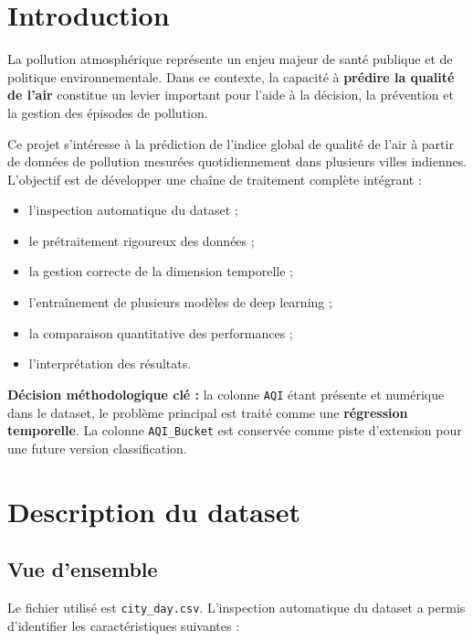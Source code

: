 \documentclass[11pt,a4paper]{article}
\newcommand{\aqi}{\texttt{AQI}}
\newcommand{\aqibucket}{\texttt{AQI\_Bucket}}
\begin{document}
\tableofcontents
\newpage

\section{Introduction}
La pollution atmosphérique représente un enjeu majeur de santé publique et de politique environnementale.
Dans ce contexte, la capacité à \textbf{prédire la qualité de l'air} constitue un levier important pour l'aide à la décision,
la prévention et la gestion des épisodes de pollution.

Ce projet s'intéresse à la prédiction de l'indice global de qualité de l'air à partir de données de pollution mesurées
quotidiennement dans plusieurs villes indiennes. L'objectif est de développer une chaîne de traitement complète intégrant :

\begin{itemize}
    \item l'inspection automatique du dataset ;
    \item le prétraitement rigoureux des données ;
    \item la gestion correcte de la dimension temporelle ;
    \item l'entraînement de plusieurs modèles de deep learning ;
    \item la comparaison quantitative des performances ;
    \item l'interprétation des résultats.
\end{itemize}

\begin{highlightbox}
\textbf{Décision méthodologique clé :} la colonne \aqi{} étant présente et numérique dans le dataset,
le problème principal est traité comme une \textbf{régression temporelle}. La colonne \aqibucket{} est conservée
comme piste d'extension pour une future version classification.
\end{highlightbox}

\section{Description du dataset}

\subsection{Vue d'ensemble}
Le fichier utilisé est \texttt{city\_day.csv}. L'inspection automatique du dataset a permis d'identifier les caractéristiques suivantes :
\end{document}
